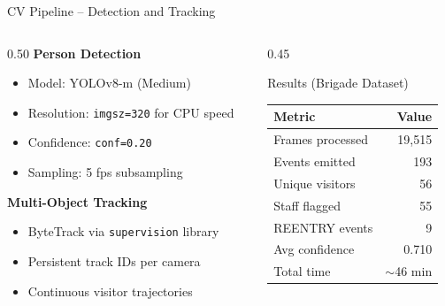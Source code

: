 \documentclass[aspectratio=169, 11pt]{beamer}
\begin{document}
\begin{frame}{CV Pipeline -- Detection and Tracking}
  \begin{columns}[T]
    \begin{column}{0.50\textwidth}
      \textbf{Person Detection}
      \begin{itemize}
        \item Model: YOLOv8-m (Medium)
        \item Resolution: \texttt{imgsz=320} for CPU speed
        \item Confidence: \texttt{conf=0.20}
        \item Sampling: 5 fps subsampling
      \end{itemize}

      \vspace{0.3cm}
      \textbf{Multi-Object Tracking}
      \begin{itemize}
        \item ByteTrack via \texttt{supervision} library
        \item Persistent track IDs per camera
        \item Continuous visitor trajectories
      \end{itemize}
    \end{column}
    \begin{column}{0.45\textwidth}
      \begin{block}{Results (Brigade Dataset)}
        \centering
        \begin{tabular}{lr}
          \toprule
          \textbf{Metric} & \textbf{Value} \\
          \midrule
          Frames processed & 19,515 \\
          Events emitted & 193 \\
          Unique visitors & 56 \\
          Staff flagged & 55 \\
          REENTRY events & 9 \\
          Avg confidence & 0.710 \\
          Total time & $\sim$46 min \\
          \bottomrule
        \end{tabular}
      \end{block}
    \end{column}
  \end{columns}
\end{frame}
\end{document}
